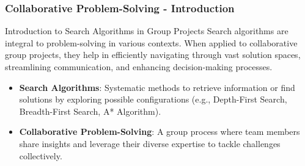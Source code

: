 \documentclass[aspectratio=169]{beamer}
\begin{document}
\begin{frame}[fragile]
    \frametitle{Collaborative Problem-Solving - Introduction}
    \begin{block}{Introduction to Search Algorithms in Group Projects}
        Search algorithms are integral to problem-solving in various contexts. When applied to collaborative group projects, they help in efficiently navigating through vast solution spaces, streamlining communication, and enhancing decision-making processes.
    \end{block}
    
    \begin{itemize}
        \item \textbf{Search Algorithms}: Systematic methods to retrieve information or find solutions by exploring possible configurations (e.g., Depth-First Search, Breadth-First Search, A* Algorithm).
        \item \textbf{Collaborative Problem-Solving}: A group process where team members share insights and leverage their diverse expertise to tackle challenges collectively.
    \end{itemize}
\end{frame}
\end{document}
